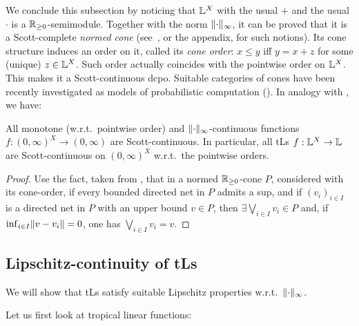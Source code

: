 We conclude this subsection by noticing that $\mathbb{L}^X$ with the usual $+$ and the usual $\cdot$ is a $\mathbb{R}_{\geq0}$-semimodule.
Together with the norm $\lVert\cdot\rVert_\infty$, it can be proved that it is a Scott-complete \emph{normed cone} (see~\cite{Selinger2004}, or the appendix, for such notions).
Its cone structure induces an order on it, called its \emph{cone order}:
$x\leq y$ iff $y=x+z$ for some (unique) $z\in\mathbb{L}^X$.
Such order actually coincides with the pointwise order on $\mathbb{L}^X$.
This makes it a Scott-continuous dcpo.
Suitable categories of cones have been recently investigated as models of probabilistic computation (\cite{Crubillie2018, EhrPagTas2018, Ehrhard2020}).
In analogy with \cite[Proposition 17]{DanEhrh2011}, we have:

\begin{theorem}\label{thm:ScottCont}
 All monotone (w.r.t.\ pointwise order) and $\lVert\cdot\rVert_{\infty}$-continuous functions $f:(0,\infty)^X\to (0,\infty)$ are Scott-continuous.
 In particular, all tLs $f:\mathbb{L}^X\to\mathbb{L}$ are Scott-continuous on $(0,\infty)^X$ w.r.t.\ the pointwise orders.
\end{theorem}
\begin{proof}
 Use the fact, taken from \cite{Selinger2004}, that in a normed $\mathbb{R}_{\geq 0}$-cone $P$, considered with its cone-order, if every bounded directed net in $P$ admits a sup, and if $(v_i)_{i\in I}$ is a directed net in $P$ with an upper bound $v\in P$, then $\exists\bigvee_{i\in I} v_i \in P$ and, if $\inf_{i\in I} \lVert v-v_i\rVert =0$, one has $\bigvee_{i\in I} v_i = v$.
\end{proof}



\subsection{Lipschitz-continuity of tLs}\label{sec:4C}%


We will show that tLs satisfy suitable Lipschitz properties w.r.t.\ $\lVert\cdot\rVert_\infty$. 

Let us first look at tropical linear functions:


